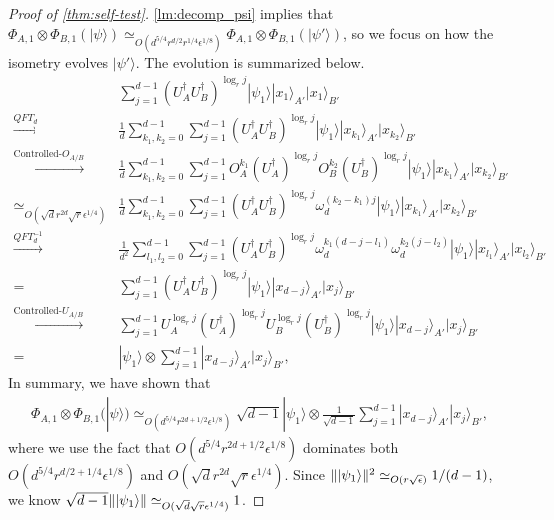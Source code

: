 \documentclass[11pt,letterpaper]{article}
\newcommand{\ket}[1]{|#1\rangle}
\newcommand{\x}{\otimes}
\newcommand{\ct}{^{\dagger}}
\DeclarePairedDelimiter{\norm}{\lVert}{\rVert}
\newcommand{\1}{\mathbb{1}}
\newcommand{\ep}{\epsilon}
\newcommand{\se}{\sqrt{\epsilon}}
\newcommand{\qe}{\epsilon^{1/4}}
\newcommand{\sd}{\sqrt{d}}
\newcommand{\sr}{\sqrt{r}}
\newcommand{\appd}[1]{\simeq_{#1}}
\theoremstyle{definition}
\begin{document}
\begin{proof}[Proof of \cref{thm:self-test}]
\cref{lm:decomp_psi} implies that $ \Phi_{A,1} \x \Phi_{B,1} (\ket{\psi}) \appd{O(d^{5/4} r^{d/2} r^{1/4} \ep^{1/8})}  \Phi_{A,1} \x \Phi_{B,1} (\ket{\psi'})$,  
so we focus on how the isometry evolves $\ket{\psi'}$.
The evolution is summarized below.
	\begin{align}
		& \sum_{j=1}^{d-1} (U_A\ct U_B\ct)^{\log_r j} \ket{\psi_1} \ket{x_1}_{A'}\ket{x_1}_{B'}\\
		\xrightarrow[]{QFT_d}& \frac{1}{d}\sum_{k_1,k_2 = 0}^{d-1} \sum_{j=1}^{d-1} (U_A\ct U_B\ct)^{\log_r j}  \ket{\psi_1}\ket{x_{k_1}}_{A'}\ket{x_{k_2}}_{B'}\\
		\xrightarrow[]{\text{Controlled-}O_{A/B}}& \frac{1}{d}\sum_{k_1,k_2 = 0}^{d-1} \sum_{j=1}^{d-1} O_A^{k_1}(U_A\ct)^{\log_r j} O_B^{k_2}(U_B\ct)^{\log_r j}
		\ket{\psi_1} \ket{x_{k_1}}_{A'}\ket{x_{k_2}}_{B'}\\
		\appd{O(\sd r^{2d} \sr \qe)}&\frac{1}{d} \sum_{k_1,k_2 = 0}^{d-1} \sum_{j=1}^{d-1} (U_A\ct U_B\ct)^{\log_r j}\omega_d^{(k_2-k_1)j}\ket{\psi_1} \ket{x_{k_1}}_{A'}\ket{x_{k_2}}_{B'}\\
		\xrightarrow[]{QFT_d^{-1}} &\frac{1}{d^2}\sum_{l_1,l_2 = 0}^{d-1}\sum_{j=1}^{d-1} (U_A\ct U_B\ct)^{\log_r j} 
		\omega_d^{k_1(d-j-l_1)}\omega_d^{k_2(j-l_2)}\ket{\psi_1} \ket{x_{l_1}}_{A'}\ket{x_{l_2}}_{B'}\\
		= &\sum_{j=1}^{d-1}(U_A\ct U_B\ct)^{\log_r j} \ket{\psi_1} \ket{x_{d-j}}_{A'}\ket{x_j}_{B'} \\
		\xrightarrow[]{\text{Controlled-}U_{A/B}}& \sum_{j=1}^{d-1} U_A^{\log_r j} (U_A\ct)^{\log_r j} U_B^{\log_r j} (U_B\ct)^{\log_r j} \ket{\psi_1} \ket{x_{d-j}}_{A'}\ket{x_j}_{B'}\\
		=&\ket{\psi_1} \x \sum_{j=1}^{d-1} \ket{x_{d-j}}_{A'}\ket{x_j}_{B'},
	\end{align}
In summary, we have shown that
\begin{align}
	\Phi_{A,1}\x\Phi_{B,1}(\ket{\psi}) \appd{O(d^{5/4} r^{2d+1/2} \ep^{1/8})} \sqrt{d-1} \ket{\psi_1} \x \frac{1}{\sqrt{d-1}}\sum_{j=1}^{d-1} \ket{x_{d-j}}_{A'}\ket{x_j}_{B'},
\end{align}
where we use the fact that $O(d^{5/4} r^{2d+1/2} \ep^{1/8})$ dominates both $O(d^{5/4} r^{d/2+1/4} \ep^{1/8})$ and 
$O(\sd r^{2d} \sr \qe)$.
Since $\norm{\ket{\psi_1}}^2 \appd{O(r \se)} 1/(d-1)$, we know $ \sqrt{d-1} \norm{\ket{\psi_1}} \appd{O(\sd \sr\qe)} 1$.


\end{proof}
\end{document}
